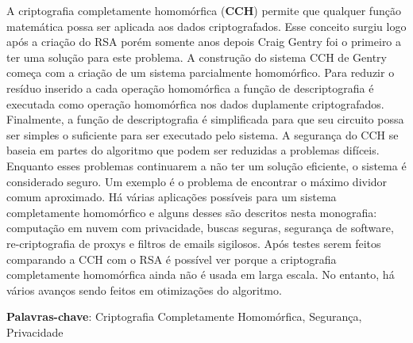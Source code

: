 A criptografia completamente homomórfica (\textbf{CCH}) permite que qualquer função matemática possa ser aplicada aos dados criptografados. Esse conceito surgiu logo após a criação do RSA porém somente anos depois Craig Gentry foi o primeiro a ter uma solução para este problema.
A construção do sistema CCH de Gentry começa com a criação de um sistema parcialmente homomórfico. Para reduzir o resíduo inserido a cada operação homomórfica a função de descriptografia é executada como operação homomórfica nos dados duplamente criptografados. Finalmente, a função de descriptografia é simplificada para que seu circuito possa ser simples o suficiente para ser executado pelo sistema.
A segurança do CCH se baseia em partes do algoritmo que podem ser reduzidas a problemas difíceis. Enquanto esses problemas continuarem a não ter um solução eficiente, o sistema é considerado seguro. Um exemplo é o problema de encontrar o máximo dividor comum aproximado.
Há várias aplicações possíveis para um sistema completamente homomórfico e alguns desses são descritos nesta monografia: computação em nuvem com privacidade, buscas seguras, segurança de software, re-criptografia de proxys e filtros de emails sigilosos.
Após testes serem feitos comparando a CCH com o RSA é possível ver porque a criptografia completamente homomórfica ainda não é usada em larga escala. No entanto, há vários avanços sendo feitos em otimizações do algoritmo.

\noindent \textbf{Palavras-chave}: Criptografia Completamente Homomórfica, Segurança, Privacidade
